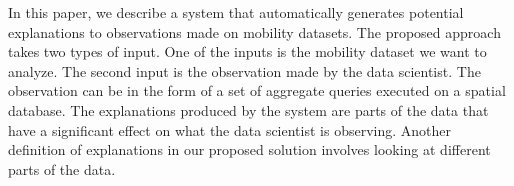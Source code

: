 



In this paper, we describe a system that automatically generates potential explanations to observations made on mobility datasets. The proposed approach takes two types of input. One of the inputs is the mobility dataset we want to analyze. The second input is the observation made by the data scientist. The observation can be in the form of a set of aggregate queries executed on a spatial database. 
The explanations produced by the system are parts of the data that have a significant effect on what the data scientist is observing. 
Another definition of explanations in our proposed solution involves looking at different parts of the data. 


